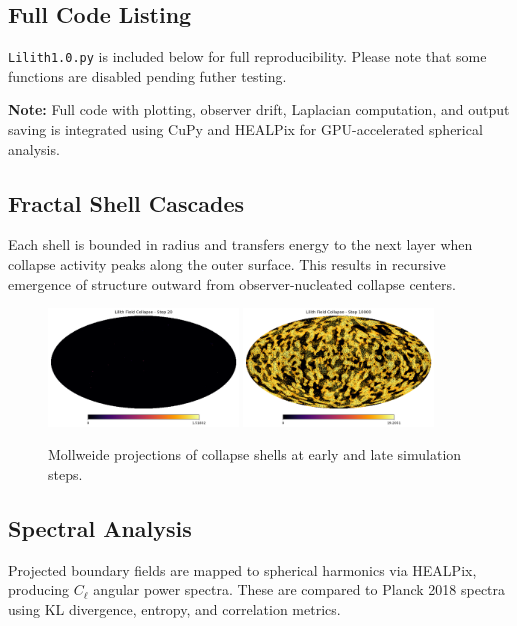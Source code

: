 \subsection{Full Code Listing}
\texttt{Lilith1.0.py} is included below for full reproducibility. Please note that some functions are disabled pending futher testing. 






\textbf{Note:} Full code with plotting, observer drift, Laplacian computation, and output saving is integrated using CuPy and HEALPix for GPU-accelerated spherical analysis.

\subsection{Fractal Shell Cascades}
Each shell is bounded in radius and transfers energy to the next layer when collapse activity peaks along the outer surface. This results in recursive emergence of structure outward from observer-nucleated collapse centers.
\begin{figure}[ht]
  \centering
  \includegraphics[width=0.45\textwidth]{images/mollweide_000020.png}
  \includegraphics[width=0.45\textwidth]{images/mollweide_010000.png}
  \caption{Mollweide projections of collapse shells at early and late simulation steps.}
\end{figure}

\subsection{Spectral Analysis}
Projected boundary fields are mapped to spherical harmonics via HEALPix, producing $C_\ell$ angular power spectra. These are compared to Planck 2018 spectra using KL divergence, entropy, and correlation metrics.

